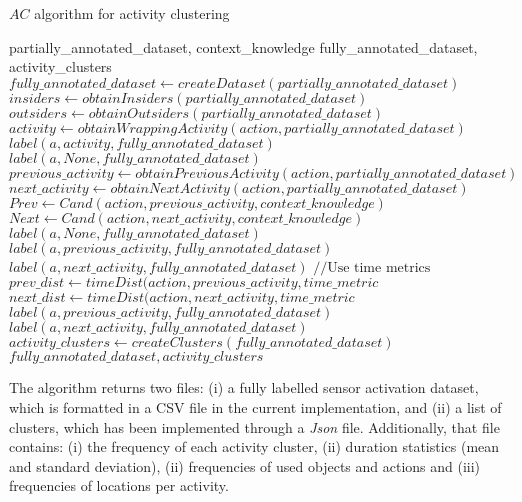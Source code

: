 \begin{algorithm}
 \caption{$AC$ algorithm for activity clustering}
 \label{alg:ac}
 \begin{algorithmic}
 \REQUIRE partially\_annotated\_dataset, context\_knowledge
 \ENSURE fully\_annotated\_dataset, activity\_clusters
 \STATE $fully\_annotated\_dataset \leftarrow createDataset(partially\_annotated\_dataset)$
 \STATE $insiders \leftarrow obtainInsiders(partially\_annotated\_dataset)$
 \STATE $outsiders \leftarrow obtainOutsiders(partially\_annotated\_dataset)$ 
  \STATE $activity \leftarrow obtainWrappingActivity(action, partially\_annotated\_dataset)$
    \STATE $label(a, activity, fully\_annotated\_dataset)$
  \ELSE
    \STATE $label(a, None, fully\_annotated\_dataset)$
  \ENDIF
 \ENDFOR 
  \STATE $previous\_activity \leftarrow obtainPreviousActivity(action, partially\_annotated\_dataset)$
  \STATE $next\_activity \leftarrow obtainNextActivity(action, partially\_annotated\_dataset)$
  \STATE $Prev \leftarrow Cand(action, previous\_activity, context\_knowledge)$
  \STATE $Next \leftarrow Cand(action, next\_activity, context\_knowledge)$
    \STATE $label(a, None, fully\_annotated\_dataset)$
    \STATE $label(a, previous\_activity, fully\_annotated\_dataset)$
    \STATE $label(a, next\_activity, fully\_annotated\_dataset)$
    \STATE $// \text{Use time metrics}$
    \STATE $prev\_dist \leftarrow timeDist(action, previous\_activity, time\_metric$
    \STATE $next\_dist \leftarrow timeDist(action, next\_activity, time\_metric$
      \STATE $label(a, previous\_activity, fully\_annotated\_dataset)$
    \ELSE
      \STATE $label(a, next\_activity, fully\_annotated\_dataset)$
    \ENDIF
  \ENDIF  
 \ENDFOR
 \STATE $activity\_clusters \leftarrow createClusters(fully\_annotated\_dataset)$
 \RETURN $fully\_annotated\_dataset, activity\_clusters$
 \end{algorithmic}
\end{algorithm}

The algorithm returns two files: (i) a fully labelled sensor activation dataset, which is formatted in a CSV file in the current implementation, and (ii) a list of clusters, which has been implemented through a \textit{Json} file. Additionally, that file contains: (i) the frequency of each activity cluster, (ii) duration statistics (mean and standard deviation), (ii) frequencies of used objects and actions and (iii) frequencies of locations per activity. 

